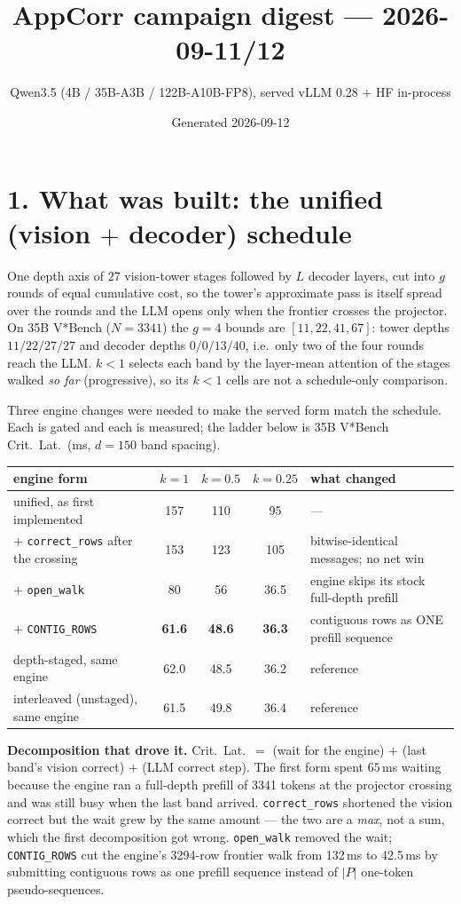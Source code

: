 \documentclass[10pt]{article}
\title{AppCorr campaign digest --- 2026-09-11/12}
\author{Qwen3.5 (4B / 35B-A3B / 122B-A10B-FP8), served vLLM 0.28 + HF in-process}
\date{Generated 2026-09-12}
\newcommand{\hh}[1]{\textbf{#1}}
\begin{document}
\maketitle

\section*{1. What was built: the unified (vision $+$ decoder) schedule}

One depth axis of $27$ vision-tower stages followed by $L$ decoder layers, cut into $g$ rounds of
equal cumulative cost, so the tower's approximate pass is itself spread over the rounds and the LLM
opens only when the frontier crosses the projector. On 35B V*Bench ($N{=}3341$) the $g{=}4$ bounds
are $[11,22,41,67]$: tower depths $11/22/27/27$ and decoder depths $0/0/13/40$, i.e.\ only two of
the four rounds reach the LLM. $k{<}1$ selects each band by the layer-mean attention of the stages
walked \emph{so far} (progressive), so its $k{<}1$ cells are not a schedule-only comparison.

Three engine changes were needed to make the served form match the schedule. Each is gated and
each is measured; the ladder below is 35B V*Bench Crit.\ Lat.\ (ms, $d{=}150$ band spacing).

\begin{table}[h]\centering\small
\begin{tabular}{lccc l}
\toprule
engine form & $k{=}1$ & $k{=}0.5$ & $k{=}0.25$ & what changed \\
\midrule
unified, as first implemented        & 157 & 110 & 95   & --- \\
$+$ \texttt{correct\_rows} after the crossing & 153 & 123 & 105 & bitwise-identical messages; no net win \\
$+$ \texttt{open\_walk}               & 80  & 56  & 36.5 & engine skips its stock full-depth prefill \\
$+$ \texttt{CONTIG\_ROWS}             & \hh{61.6} & \hh{48.6} & \hh{36.3} & contiguous rows as ONE prefill sequence \\
\midrule
depth-staged, same engine            & 62.0 & 48.5 & 36.2 & reference \\
interleaved (unstaged), same engine  & 61.5 & 49.8 & 36.4 & reference \\
\bottomrule
\end{tabular}
\end{table}

\noindent\textbf{Decomposition that drove it.} Crit.\ Lat.\ $=$ (wait for the engine) $+$ (last
band's vision correct) $+$ (LLM correct step). The first form spent $65$\,ms waiting because the
engine ran a full-depth prefill of 3341 tokens at the projector crossing and was still busy when
the last band arrived. \texttt{correct\_rows} shortened the vision correct but the wait grew by the
same amount --- the two are a \emph{max}, not a sum, which the first decomposition got wrong.
\texttt{open\_walk} removed the wait; \texttt{CONTIG\_ROWS} cut the engine's 3294-row frontier walk
from 132\,ms to 42.5\,ms by submitting contiguous rows as one prefill sequence instead of $|P|$
one-token pseudo-sequences.
\end{document}
